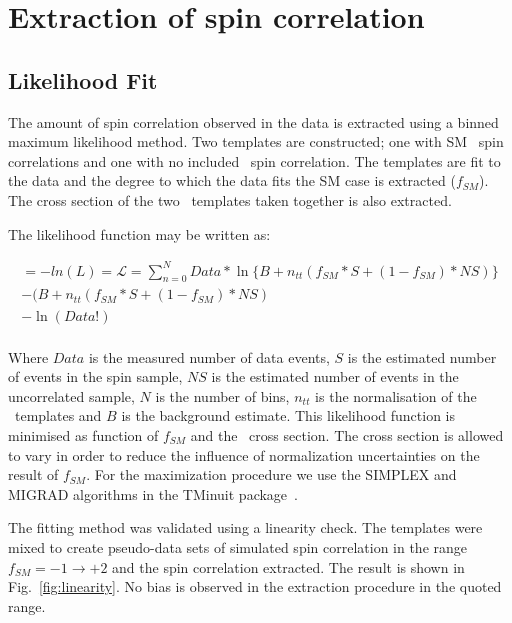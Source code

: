 \chapter{Extraction of spin correlation}

\section{Likelihood Fit}
\label{sec:extraction}

The amount of spin correlation observed in the data is extracted using a binned maximum likelihood method. Two templates are constructed; one with SM \ttbar\ spin correlations and one with no included \ttbar\ spin correlation. The templates are fit to the data and the degree to which the data fits the SM case is extracted ($f_{SM}$). The cross section of the two \ttbar\ templates taken together is also extracted. 

The likelihood function may be written as:

\begin{equation}
  \begin{aligned}
    =-ln(L) = \mathcal{L} = \displaystyle\sum\limits_{n=0}^{N} Data*\ln\{B + n_{tt}(f_{SM}*S + (1-f_{SM})*NS)\} \\
                  - (B + n_{tt}(f_{SM}*S + (1-f_{SM})*NS) \\
		  - \ln(Data!) \\
  \end{aligned}
\end{equation}

Where $Data$ is the measured number of data events, $S$ is the estimated number of events in the spin sample, $NS$ is the estimated number of events in the uncorrelated sample, $N$ is the number of bins, $n_{tt}$ is the normalisation of the \ttbar\ templates and $B$ is the background estimate. This likelihood function is minimised as function of $f_{SM}$ and the \ttbar\ cross section. The cross section is allowed to vary in order to reduce the influence of normalization uncertainties on the result of $f_{SM}$. For the maximization procedure we use the SIMPLEX and MIGRAD algorithms in the TMinuit package~\cite{James:1975dr}.

The fitting method was validated using a linearity check. The templates were mixed to create pseudo-data sets of simulated spin correlation in the range $f_{SM} = -1 \rightarrow +2$ and the spin correlation extracted. The result is shown in Fig.~\ref{fig:linearity}. No bias is observed in the extraction procedure in the quoted range.

